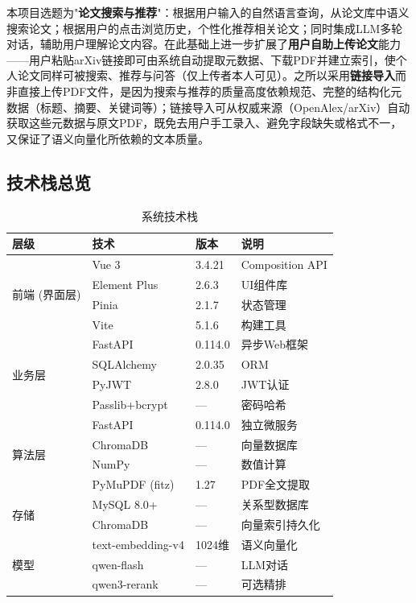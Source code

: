 \documentclass[12pt,a4paper]{ctexart}
\begin{document}
本项目选题为"\textbf{论文搜索与推荐}"：根据用户输入的自然语言查询，从论文库中语义搜索论文；根据用户的点击浏览历史，个性化推荐相关论文；同时集成LLM多轮对话，辅助用户理解论文内容。在此基础上进一步扩展了\textbf{用户自助上传论文}能力——用户粘贴arXiv链接即可由系统自动提取元数据、下载PDF并建立索引，使个人论文同样可被搜索、推荐与问答（仅上传者本人可见）。之所以采用\textbf{链接导入}而非直接上传PDF文件，是因为搜索与推荐的质量高度依赖规范、完整的结构化元数据（标题、摘要、关键词等）；链接导入可从权威来源（OpenAlex/arXiv）自动获取这些元数据与原文PDF，既免去用户手工录入、避免字段缺失或格式不一，又保证了语义向量化所依赖的文本质量。

\subsection{技术栈总览}

\begin{table}[H]
\centering
\caption{系统技术栈}
\label{tab:techstack}
\begin{tabular}{llll}
\toprule
\textbf{层级} & \textbf{技术} & \textbf{版本} & \textbf{说明} \\
\midrule
\multirow{4}{*}{前端 (界面层)}
  & Vue 3          & 3.4.21 & Composition API \\
  & Element Plus   & 2.6.3  & UI组件库 \\
  & Pinia          & 2.1.7  & 状态管理 \\
  & Vite           & 5.1.6  & 构建工具 \\
\midrule
\multirow{4}{*}{业务层}
  & FastAPI        & 0.114.0 & 异步Web框架 \\
  & SQLAlchemy     & 2.0.35  & ORM \\
  & PyJWT          & 2.8.0   & JWT认证 \\
  & Passlib+bcrypt & —       & 密码哈希 \\
\midrule
\multirow{4}{*}{算法层}
  & FastAPI        & 0.114.0 & 独立微服务 \\
  & ChromaDB       & —       & 向量数据库 \\
  & NumPy          & —       & 数值计算 \\
  & PyMuPDF (fitz) & 1.27    & PDF全文提取 \\
\midrule
\multirow{2}{*}{存储}
  & MySQL 8.0+     & —       & 关系型数据库 \\
  & ChromaDB       & —       & 向量索引持久化 \\
\midrule
\multirow{3}{*}{模型}
  & text-embedding-v4 & 1024维 & 语义向量化 \\
  & qwen-flash        & —      & LLM对话 \\
  & qwen3-rerank      & —      & 可选精排 \\
\bottomrule
\end{tabular}
\end{table}
\end{document}
